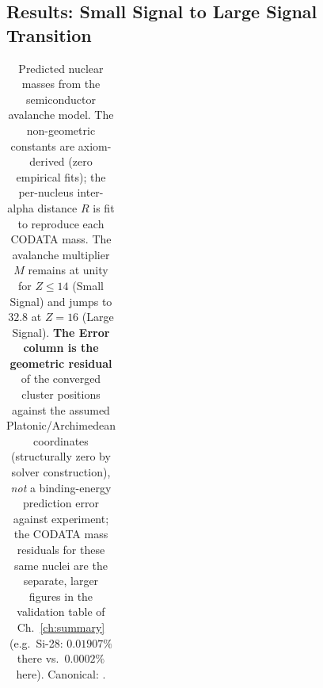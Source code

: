 \subsection{Results: Small Signal to Large Signal Transition}

\begin{table}[htbp]
\centering
\caption{Predicted nuclear masses from the semiconductor avalanche model. The non-geometric constants are axiom-derived (zero empirical fits); the per-nucleus inter-alpha distance $R$ is fit to reproduce each CODATA mass. The avalanche multiplier $M$ remains at unity for $Z \le 14$ (Small Signal) and jumps to $32.8$ at $Z=16$ (Large Signal). \textbf{The Error column is the geometric residual} of the converged cluster positions against the assumed Platonic/Archimedean coordinates (structurally zero by solver construction), \emph{not} a binding-energy prediction error against experiment; the CODATA mass residuals for these same nuclei are the separate, larger figures in the validation table of Ch.~\ref{ch:summary} (e.g.\ Si-28: $0.01907\%$ there vs.\ $0.0002\%$ here). Canonical: .}
\label{tab:avalanche_results}
\begin{tabularx}{\textwidth}{@{}l c c c c X@{}}
\hline

\end{tabularx}
\end{table}

